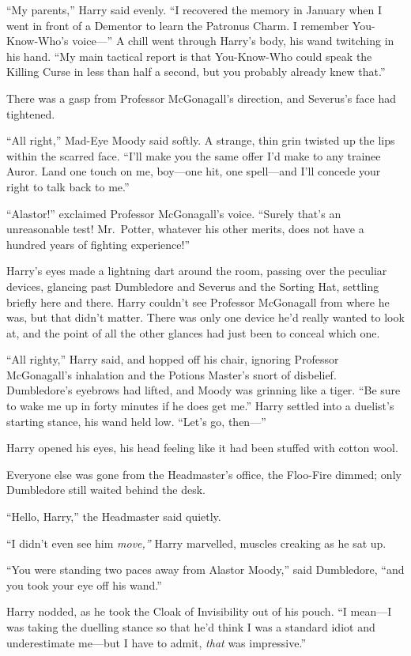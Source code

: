 ``My parents,'' Harry said evenly. ``I recovered the memory in January
when I went in front of a Dementor to learn the Patronus Charm. I
remember You-Know-Who's voice---'' A chill went through Harry's body,
his wand twitching in his hand. ``My main tactical report is that
You-Know-Who could speak the Killing Curse in less than half a second,
but you probably already knew that.''

There was a gasp from Professor McGonagall's direction, and Severus's
face had tightened.

``All right,'' Mad-Eye Moody said softly. A strange, thin grin twisted
up the lips within the scarred face. ``I'll make you the same offer I'd
make to any trainee Auror. Land one touch on me, boy---one hit, one
spell---and I'll concede your right to talk back to me.''

``Alastor!'' exclaimed Professor McGonagall's voice. ``Surely that's an
unreasonable test! Mr.~Potter, whatever his other merits, does not have
a hundred years of fighting experience!''

Harry's eyes made a lightning dart around the room, passing over the
peculiar devices, glancing past Dumbledore and Severus and the Sorting
Hat, settling briefly here and there. Harry couldn't see Professor
McGonagall from where he was, but that didn't matter. There was only one
device he'd really wanted to look at, and the point of all the other
glances had just been to conceal which one.

``All righty,'' Harry said, and hopped off his chair, ignoring Professor
McGonagall's inhalation and the Potions Master's snort of disbelief.
Dumbledore's eyebrows had lifted, and Moody was grinning like a tiger.
``Be sure to wake me up in forty minutes if he does get me.'' Harry
settled into a duelist's starting stance, his wand held low. ``Let's go,
then---''

Harry opened his eyes, his head feeling like it had been stuffed with
cotton wool.

Everyone else was gone from the Headmaster's office, the Floo-Fire
dimmed; only Dumbledore still waited behind the desk.

``Hello, Harry,'' the Headmaster said quietly.

``I didn't even see him \emph{move,''} Harry marvelled, muscles creaking
as he sat up.

``You were standing two paces away from Alastor Moody,'' said
Dumbledore, ``and you took your eye off his wand.''

Harry nodded, as he took the Cloak of Invisibility out of his pouch. ``I
mean---I was taking the duelling stance so that he'd think I was a
standard idiot and underestimate me---but I have to admit, \emph{that}
was impressive.''

